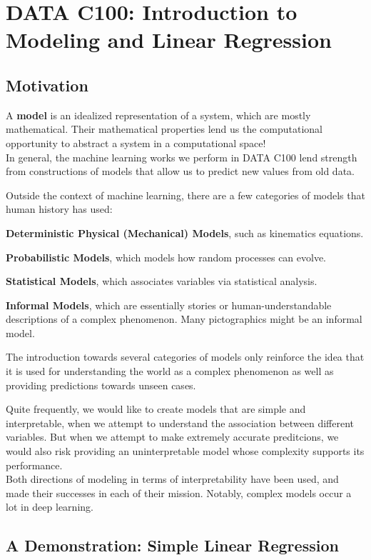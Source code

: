 \chapter{DATA C100: Introduction to Modeling and Linear Regression}

\section{Motivation}
A \textbf{model} is an idealized representation of a system, which are mostly mathematical. Their mathematical properties lend us the computational opportunity to abstract a system in a computational space! \\
In general, the machine learning works we perform in DATA C100 lend strength from constructions of models that allow us to predict new values from old data.

Outside the context of machine learning, there are a few categories of models that human history has used:
\begin{bindenum}
    \item \textbf{Deterministic Physical (Mechanical) Models}, such as kinematics equations.
    \item \textbf{Probabilistic Models}, which models how random processes can evolve.
    \item \textbf{Statistical Models}, which associates variables via statistical analysis.
    \item \textbf{Informal Models}, which are essentially stories or human-understandable descriptions of a complex phenomenon. Many pictographics might be an informal model.
\end{bindenum}
The introduction towards several categories of models only reinforce the idea that it is used for understanding the world as a complex phenomenon as well as providing predictions towards unseen cases.

Quite frequently, we would like to create models that are simple and interpretable, when we attempt to understand the association between different variables.
But when we attempt to make extremely accurate preditcions, we would also risk providing an uninterpretable model whose complexity supports its performance. \\
Both directions of modeling in terms of interpretability have been used, and made their successes in each of their mission. Notably, complex models occur a lot in deep learning. \\

\section{A Demonstration: Simple Linear Regression}


